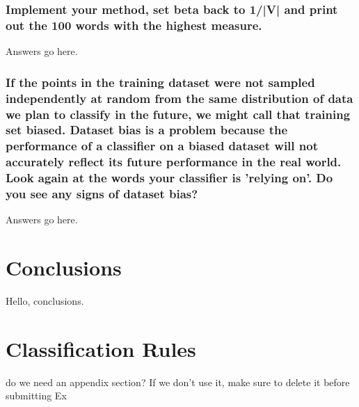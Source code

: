 \documentclass{IEEEtran}
\begin{document}
\subsubsection{Implement your method, set beta back to 1/|V| and print out the 100 words with the highest measure.}
Answers go here.

\subsubsection{If the points in the training dataset were not sampled independently at random from the same distribution of data we plan to classify in the future, we might call that training set biased. Dataset bias is a problem because the performance of a classifier on a biased dataset will not accurately reflect its future performance in the real world. Look again at the words your classifier is 'relying on'. Do you see any signs of dataset bias?}
Answers go here.

\section{Conclusions}
Hello, conclusions.

\printbibliography

\newpage
\onecolumn
\appendix
\section{Classification Rules}
do we need an appendix section?  If we don't use it, make sure to delete it before submitting
Ex
\end{document}
